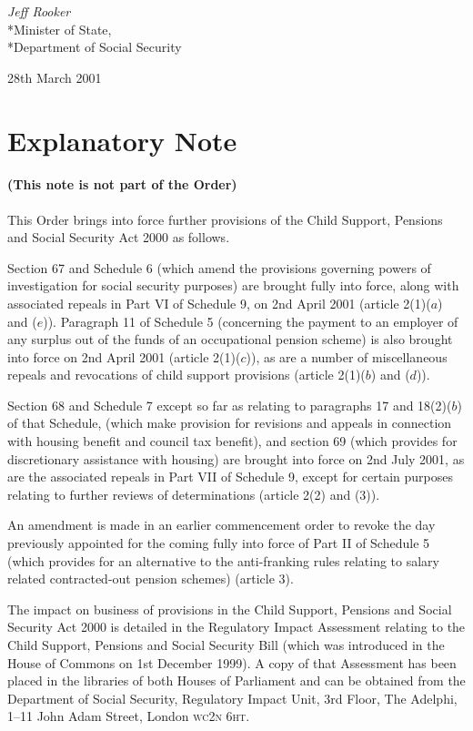\documentclass[12pt,a4paper]{article}
\begin{document}
{\raggedleft
\emph{Jeff Rooker}\\*Minister of State,\\*Department of Social Security

}

28th March 2001

\small

\part{Explanatory Note}

\renewcommand\parthead{— Explanatory Note}

\subsection*{(This note is not part of the Order)}

This Order brings into force further provisions of the Child Support, Pensions and Social Security Act 2000 as follows.

Section 67 and Schedule 6 (which amend the provisions governing powers of investigation for social security purposes) are brought fully into force, along with associated repeals in Part VI of Schedule 9, on 2nd April 2001 (article 2(1)($a$)  and ($e$)). Paragraph 11 of Schedule 5 (concerning the payment to an employer of any surplus out of the funds of an occupational pension scheme) is also brought into force on 2nd April 2001 (article 2(1)($c$)), as are a number of miscellaneous repeals and revocations of child support provisions (article 2(1)($b$)  and ($d$)).

Section 68 and Schedule 7 except so far as relating to paragraphs 17 and 18(2)($b$)  of that Schedule, (which make provision for revisions and appeals in connection with housing benefit and council tax benefit), and section 69 (which provides for discretionary assistance with housing) are brought into force on 2nd July 2001, as are the associated repeals in Part VII of Schedule 9, except for certain purposes relating to further reviews of determinations (article 2(2) and (3)).

An amendment is made in an earlier commencement order to revoke the day previously appointed for the coming fully into force of Part II of Schedule 5 (which provides for an alternative to the anti-franking rules relating to salary related contracted-out pension schemes) (article 3).

The impact on business of provisions in the Child Support, Pensions and Social Security Act 2000 is detailed in the Regulatory Impact Assessment relating to the Child Support, Pensions and Social Security Bill (which was introduced in the House of Commons on 1st December 1999). A copy of that Assessment has been placed in the libraries of both Houses of Parliament and can be obtained from the Department of Social Security, Regulatory Impact Unit, 3rd Floor, The Adelphi, 1–11 John Adam Street, London \textsc{\lowercase{WC2N 6HT}}. 
\end{document}

